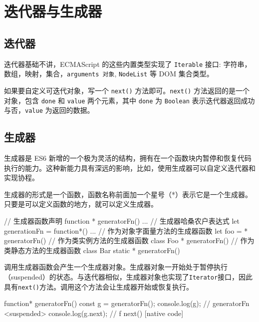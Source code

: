 \section{迭代器与生成器}

\subsection{迭代器}

迭代器基础不讲，ECMAScript 的这些内置类型实现了 \texttt{Iterable} 接口: 字符串，数组，映射，集合，\texttt{arguments 对象}, \texttt{NodeList} 等 DOM 集合类型。

如果要自定义可迭代对象，写一个 \texttt{next()} 方法即可。\texttt{next()} 方法返回的是一个对象，包含 \texttt{done} 和 \texttt{value} 两个元素，其中 \texttt{done} 为 \texttt{Boolean} 表示迭代器返回成功与否，\texttt{value} 为返回的数据。

\subsection{生成器}

生成器是 ES6 新增的一个极为灵活的结构，拥有在一个函数块内暂停和恢复代码执行的能力。这种新能力具有深远的影响，比如，使用生成器可以自定义迭代器和实现协程。

生成器的形式是一个函数，函数名称前面加一个星号（*）表示它是一个生成器。只要是可以定义函数的地方，就可以定义生成器。

\begin{JavaScript}
// 生成器函数声明
function * generatorFn() {...}
// 生成器哈桑农户表达式
let generationFn = function*() {...}
// 作为对象字面量方法的生成器函数
let foo = {    
    * generatorFn() {} 
} 
// 作为类实例方法的生成器函数
class Foo {   
    * generatorFn() {} 
} 
// 作为类静态方法的生成器函数
class Bar {   
    static * generatorFn() {} 
} 
\end{JavaScript}


调用生成器函数会产生一个生成器对象。生成器对象一开始处于暂停执行（suspended）的状态。与迭代器相似，生成器对象也实现了\texttt{Iterator}接口，因此具有\texttt{next()}方法。调用这个方法会让生成器开始或恢复执行。

\begin{JavaScript}
function* generatorFn() {} 
const g = generatorFn(); 
console.log(g);       // generatorFn {<suspended>} 
console.log(g.next);  // f next() { [native code] } 
\end{JavaScript}

